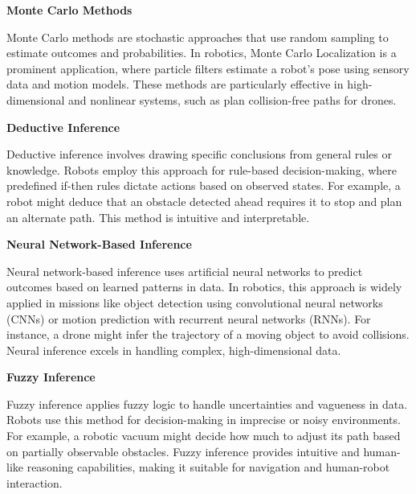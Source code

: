 \documentclass{book}
\providecommand{\ProjectDeepHeading}[2]{%
    \par\medskip\noindent\textbf{#2}\par\smallskip
}
\begin{document}
    \ProjectDeepHeading{4}{Monte Carlo Methods}
    Monte Carlo methods are stochastic approaches that use random sampling to estimate outcomes and probabilities. In robotics, Monte Carlo Localization is a prominent application, where particle filters estimate a robot’s pose using sensory data and motion models. These methods are particularly effective in high-dimensional and nonlinear systems, such as plan collision-free paths for drones.

    \ProjectDeepHeading{4}{Deductive Inference}
    Deductive inference involves drawing specific conclusions from general rules or knowledge. Robots employ this approach for rule-based decision-making, where predefined if-then rules dictate actions based on observed states. For example, a robot might deduce that an obstacle detected ahead requires it to stop and plan an alternate path. This method is intuitive and interpretable. 

    \ProjectDeepHeading{4}{Neural Network-Based Inference}
    Neural network-based inference uses artificial neural networks to predict outcomes based on learned patterns in data. In robotics, this approach is widely applied in missions like object detection using convolutional neural networks (CNNs) or motion prediction with recurrent neural networks (RNNs). For instance, a drone might infer the trajectory of a moving object to avoid collisions. Neural inference excels in handling complex, high-dimensional data.

    \ProjectDeepHeading{4}{Fuzzy Inference}
    Fuzzy inference applies fuzzy logic to handle uncertainties and vagueness in data. Robots use this method for decision-making in imprecise or noisy environments. For example, a robotic vacuum might decide how much to adjust its path based on partially observable obstacles. Fuzzy inference provides intuitive and human-like reasoning capabilities, making it suitable for navigation and human-robot interaction.

\end{document}
